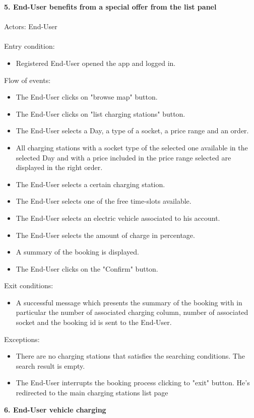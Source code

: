 \documentclass[a4paper]{report}
\begin{document}
\textbf{5. End-User benefits from a special offer from the list panel}\label{uc:5}
\\ \\
Actors: End-User \\ \\
Entry condition:
\begin{itemize}
\item Registered End-User opened the app and logged in.
\end{itemize}
Flow of events:
\begin{itemize}
\item The End-User clicks on "browse map" button.
\item The End-User clicks on "list charging stations" button.
\item The End-User selects a Day, a type of a socket, a price range and an order.
\item All charging stations with a socket type of the selected one available in the selected Day and with a price included in the price range selected are displayed in the right order.
\item The End-User selects a certain charging station.
\item The End-User selects one of the free time-slots available.
\item The End-User selects an electric vehicle associated to his account.
\item The End-User selects the amount of charge in percentage.
\item A summary of the booking is displayed.
\item The End-User clicks on the "Confirm" button.
\end{itemize}
Exit conditions:
\begin{itemize}
\item A successful message which presents the summary of the booking with in particular the number of associated charging column, number of associated socket and the booking id is sent to the End-User.
 \end{itemize}
Exceptions:
 \begin{itemize}
 \item There are no charging stations that satisfies the searching conditions. The search result is empty.
 \item The End-User interrupts the booking process clicking to "exit" button. He's redirected to the main charging stations list page
\end{itemize}
\textbf{6. End-User vehicle charging}\label{uc:7}
\end{document}
